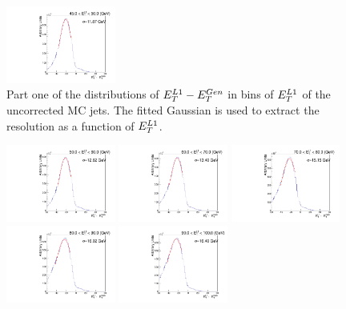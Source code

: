 \begin{figure}[h!]
          \includegraphics[width=0.32\textwidth]{detector/l1jet/gaussfits//ptBin_6_PtAll_u.pdf}
    \caption{Part one of the distributions of $E_{T}^{L1}-E_{T}^{Gen}$ in bins of $E_{T}^{L1}$ of the uncorrected MC jets. 
	The fitted Gaussian is used to extract the resolution as a function of $E_{T}^{L1}$.}
    \label{fig:mcresfits_u_p1}
\end{figure}

\begin{figure}[h!]
    \centering
          \includegraphics[width=0.32\textwidth]{detector/l1jet/gaussfits//ptBin_7_PtAll_u.pdf}
          \includegraphics[width=0.32\textwidth]{detector/l1jet/gaussfits//ptBin_8_PtAll_u.pdf}
          \includegraphics[width=0.32\textwidth]{detector/l1jet/gaussfits//ptBin_9_PtAll_u.pdf}\\
          \includegraphics[width=0.32\textwidth]{detector/l1jet/gaussfits//ptBin_10_PtAll_u.pdf}
          \includegraphics[width=0.32\textwidth]{detector/l1jet/gaussfits//ptBin_11_PtAll_u.pdf}

\end{figure}
